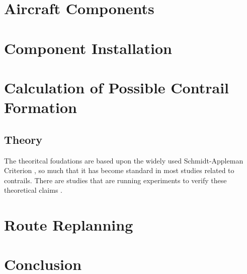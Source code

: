 \documentclass[a4paper, 12pt]{report}
\begin{document}
\chapter{Aircraft Components}


\chapter{Component Installation}

\chapter{Calculation of Possible Contrail Formation}
\section{Theory}
The theoritcal foudations are based upon the widely used Schmidt-Appleman Criterion \cite{appleman1953formation}, so much that it has become standard in most studies related to contrails. There are studies that are running experiments to verify these theoretical claims \cite{ghedhaifi2019influence}.


\chapter{Route Replanning}

\chapter{Conclusion}


\printbibliography
    
\end{document}
